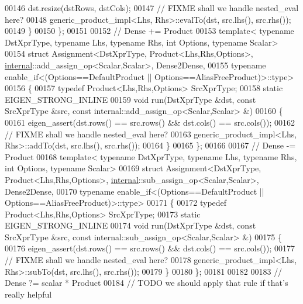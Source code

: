 \begin{DoxyCode}
00146       dst.resize(dstRows, dstCols);
00147     \textcolor{comment}{// FIXME shall we handle nested\_eval here?}
00148     generic\_product\_impl<Lhs, Rhs>::evalTo(dst, src.lhs(), src.rhs());
00149   \}
00150 \};
00151 
00152 \textcolor{comment}{// Dense += Product}
00153 \textcolor{keyword}{template}< \textcolor{keyword}{typename} DstXprType, \textcolor{keyword}{typename} Lhs, \textcolor{keyword}{typename} Rhs, \textcolor{keywordtype}{int} Options, \textcolor{keyword}{typename} Scalar>
00154 \textcolor{keyword}{struct }Assignment<DstXprType, Product<Lhs,Rhs,Options>, \hyperlink{namespaceinternal}{internal}::add\_assign\_op<Scalar,Scalar>, 
      Dense2Dense,
00155   typename enable\_if<(Options==DefaultProduct || Options==AliasFreeProduct)>::type>
00156 \{
00157   \textcolor{keyword}{typedef} Product<Lhs,Rhs,Options> SrcXprType;
00158   \textcolor{keyword}{static} EIGEN\_STRONG\_INLINE
00159   \textcolor{keywordtype}{void} run(DstXprType &dst, \textcolor{keyword}{const} SrcXprType &src, \textcolor{keyword}{const} internal::add\_assign\_op<Scalar,Scalar> &)
00160   \{
00161     eigen\_assert(dst.rows() == src.rows() && dst.cols() == src.cols());
00162     \textcolor{comment}{// FIXME shall we handle nested\_eval here?}
00163     generic\_product\_impl<Lhs, Rhs>::addTo(dst, src.lhs(), src.rhs());
00164   \}
00165 \};
00166 
00167 \textcolor{comment}{// Dense -= Product}
00168 \textcolor{keyword}{template}< \textcolor{keyword}{typename} DstXprType, \textcolor{keyword}{typename} Lhs, \textcolor{keyword}{typename} Rhs, \textcolor{keywordtype}{int} Options, \textcolor{keyword}{typename} Scalar>
00169 \textcolor{keyword}{struct }Assignment<DstXprType, Product<Lhs,Rhs,Options>, \hyperlink{namespaceinternal}{internal}::sub\_assign\_op<Scalar,Scalar>, 
      Dense2Dense,
00170   typename enable\_if<(Options==DefaultProduct || Options==AliasFreeProduct)>::type>
00171 \{
00172   \textcolor{keyword}{typedef} Product<Lhs,Rhs,Options> SrcXprType;
00173   \textcolor{keyword}{static} EIGEN\_STRONG\_INLINE
00174   \textcolor{keywordtype}{void} run(DstXprType &dst, \textcolor{keyword}{const} SrcXprType &src, \textcolor{keyword}{const} internal::sub\_assign\_op<Scalar,Scalar> &)
00175   \{
00176     eigen\_assert(dst.rows() == src.rows() && dst.cols() == src.cols());
00177     \textcolor{comment}{// FIXME shall we handle nested\_eval here?}
00178     generic\_product\_impl<Lhs, Rhs>::subTo(dst, src.lhs(), src.rhs());
00179   \}
00180 \};
00181 
00182 
00183 \textcolor{comment}{// Dense ?= scalar * Product}
00184 \textcolor{comment}{// TODO we should apply that rule if that's really helpful}

\end{DoxyCode}
